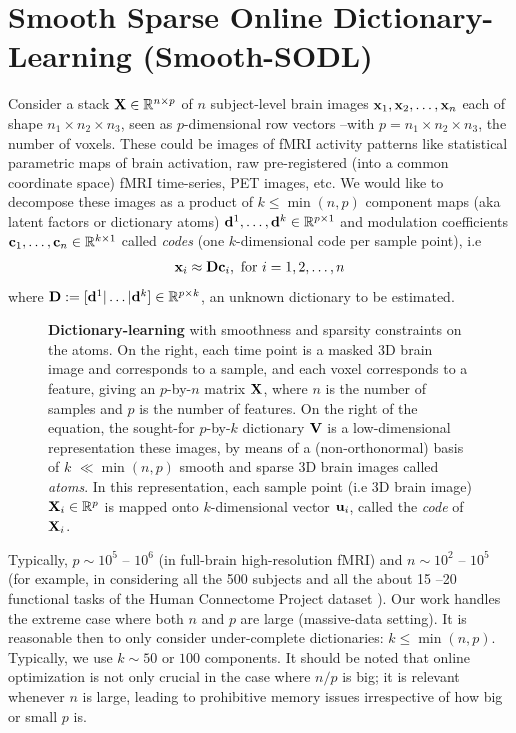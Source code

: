 \section{Smooth Sparse Online Dictionary-Learning (Smooth-SODL)}
\label{sec:contrib}  
% 
Consider a stack $\mathbf{X}
\in \mathbb R^{n \times p}$ of $n$ subject-level brain images
$\mathbf{x}_1,\mathbf{x}_2,\ldots,\mathbf{x}_n$ each of shape $n_1 \times n_2 \times n_3$, seen as
$p$-dimensional row vectors --with $p = n_1\times n_2 \times n_3$, the number of voxels. These could be images of fMRI activity
patterns like statistical parametric maps of brain activation, raw
pre-registered (into a common coordinate space) fMRI time-series, PET
images, etc. We would like to decompose these images as a product of
$k \le \min(n, p)$ component maps (aka latent factors or dictionary atoms)
 $\mathbf{d}^1,
\ldots, \mathbf{d}^k \in \mathbb{R}^{p \times 1}$ and modulation coefficients
$\mathbf{c}_1, \ldots, \mathbf{c}_n \in \mathbb R^{k \times 1}$ called \textit{codes} (one $k$-dimensional code per sample point), i.e
\begin{eqnarray}
\mathbf{x}_i \approx \mathbf{D} \mathbf{c}_i, \text{ for } i=1,2,\ldots,n
\end{eqnarray}
where $\mathbf{D} := [\mathbf{d}^1|\ldots|\mathbf{d}^k] \in \mathbb{R}^{p \times k}$, an unknown dictionary to be estimated.
\begin{figure}
    \centering
    \def\svgwidth{\columnwidth}
    
    \caption{\textbf{Dictionary-learning} with smoothness and sparsity constraints on the atoms. On the right, each time point is a masked 3D brain
      image and corresponds to a sample, and each voxel corresponds to a feature, giving an $p$-by-$n$ matrix $\mathbf{X}$, where $n$ is the number
      of samples and $p$ is the number of features.
      On the right of the equation, the sought-for $p$-by-$k$ dictionary $\mathbf{V}$  is a low-dimensional representation these images,
      by means of a (non-orthonormal) basis of $k$ $\ll \min(n,p)$ smooth and sparse 3D brain images called \textit{atoms}.
      In this representation, each sample point (i.e 3D brain image) $\mathbf{X}_i \in \mathbb R^p$
      is mapped onto $k$-dimensional vector $\mathbf{u}_i$, called the \textit{code} of $\mathbf{X}_i$.
      }
    \label{fig:smoothdict}
  \end{figure}
Typically, $p \sim 10^{5}$ --
$10^{6}$ (in full-brain high-resolution fMRI) and $n \sim 10^{2}$ --
$10^{5}$ (for example, in considering all the 500 subjects and all
the about 15 --20 functional tasks of the Human Connectome Project dataset   \citep{VanEssen20122222}). Our work handles the extreme
case where both $n$ and $p$ are large (massive-data setting). 
%
It is reasonable then to only consider under-complete dictionaries: $k
\le \min(n, p)$. Typically, we use $k \sim 50$ or $100$ components.
%
It should be noted that online optimization is not only crucial in the
case where $n / p$ is big; it is relevant whenever $n$ is large,
leading to prohibitive memory issues irrespective of how big or small
$p$ is.


